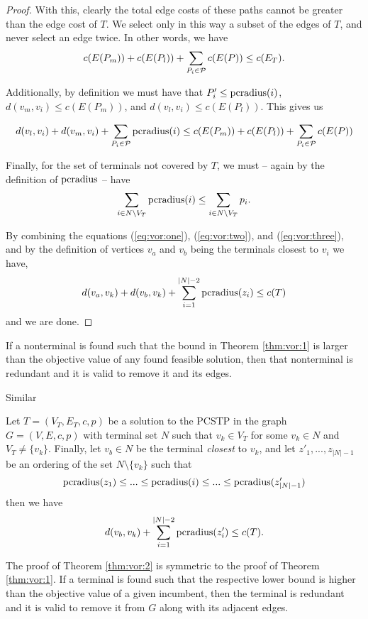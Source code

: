 \begin{proof}
With this, clearly the total edge costs of these paths cannot be greater than the edge cost of $T$. We select only
 in this way a subset of the edges of $T$, and never select an edge twice. In other words, we have
  \begin{equation}
    c(E(P_m)) + c(E(P_l)) + \sum_{P_i \in \mathcal{P}} c(E(P)) \leq c(E_T)\mathnormal{.}\label{eq:vor:one}
  \end{equation}

  
  Additionally, by definition
  we must have that $P_i' \leq \operatorname{pcradius}(i)$, $d(v_m, v_i) \leq c(E(P_m))$, and
  $d(v_l, v_i) \leq c(E(P_l))$. This gives us

  \begin{equation}
d(v_l, v_i) + d(v_m, v_i) + \sum_{P_i \in \mathcal{P}} \operatorname{pcradius}(i) \leq c(E(P_m)) + c(E(P_l)) + \sum_{P_i \in \mathcal{P}} c(E(P))\label{eq:vor:two}
\end{equation}


  Finally, for the set of terminals not covered by $T$, we must -- again by the definition of $\operatorname{pcradius}$ -- have
  \begin{equation}
  \sum_{i \in N \setminus V_T} \operatorname{pcradius}(i) \leq \sum_{i \in N \setminus V_T} p_i \mathnormal{.}\label{eq:vor:three}
  \end{equation}

  By combining the equations (\ref{eq:vor:one}), (\ref{eq:vor:two}), and (\ref{eq:vor:three}), and
   by the definition of vertices $v_a$ and $v_b$ being the terminals closest to $v_i$ we have,
   $$d(v_a, v_k) + d(v_b, v_k) + \sum_{i = 1}^{|N| - 2} \operatorname{pcradius}(z_i) \leq c(T)$$
   and we are done.
 \end{proof}
 If a nonterminal is found such that the bound in Theorem \ref{thm:vor:1} is larger than the objective value of
 any found feasible solution, then that nonterminal is redundant and it is valid to remove it and its edges.

 Similar 
\begin{theorem}\label{thm:vor:2}
  Let $T = (V_T, E_T, c, p)$ be a solution to the PCSTP in the graph $G = (V, E, c, p)$ with terminal set $N$ such that
  $v_k \in V_T$ for some $v_k \in N$ and $V_T \neq \{v_k\}$. Finally, let $v_b \in N$ be the terminal \textit{closest}
  to $v_k$, and let $z'_1, ..., z_{|N|-1}$ be an ordering of the set $N \setminus \{v_k\}$ such that
  $$\operatorname{pcradius}(z_1) \leq ... \leq \operatorname{pcradius}(i) \leq ... \leq \operatorname{pcradius}(z'_{|N|-1})$$
  then we have
  $$d(v_b, v_k) + \sum_{i = 1}^{|N| - 2} \operatorname{pcradius}(z'_i) \leq c(T)\mathnormal{.}$$
\end{theorem}
The proof of Theorem \ref{thm:vor:2} is symmetric to the proof of Theorem \ref{thm:vor:1}. If a terminal is found such that
the respective lower bound is higher than the objective value of a given incumbent, then the terminal is redundant and it is
 valid to remove it from $G$ along with its adjacent edges.


